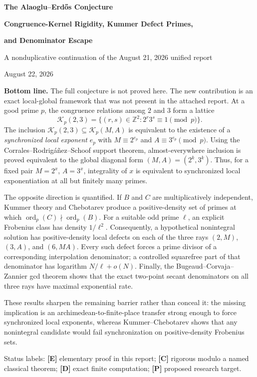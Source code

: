 \documentclass[11pt]{article}
\theoremstyle{definition}
\newcommand{\Z}{\mathbb Z}
\newcommand{\ord}{\operatorname{ord}}
\newcommand{\Rel}{\mathcal K}
\newcommand{\statusE}{\textcolor{deepgreen}{\textbf{[E]}}}
\newcommand{\statusC}{\textcolor{deepblue}{\textbf{[C]}}}
\newcommand{\statusD}{\textcolor{deepred}{\textbf{[D]}}}
\newcommand{\statusP}{\textcolor{orange!70!black}{\textbf{[P]}}}
\begin{document}

\begin{titlepage}
\centering
\vspace*{0.65cm}
{\Huge\bfseries The Alaoglu--Erd\H{o}s Conjecture\par}
\vspace{0.4cm}
{\LARGE\bfseries Congruence-Kernel Rigidity, Kummer Defect Primes,\par}
\vspace{0.14cm}
{\LARGE\bfseries and Denominator Escape\par}
\vspace{0.65cm}
{\large A nonduplicative continuation of the August 21, 2026 unified report\par}
\vspace{0.2cm}
{\large August 22, 2026\par}
\vfill
\begin{minipage}{0.9\textwidth}
\small
\textbf{Bottom line.}
The full conjecture is not proved here.  The new contribution is an exact local-global
framework that was not present in the attached report.  At a good prime $p$, the congruence
relations among $2$ and $3$ form a lattice
\[
 \Rel_p(2,3)=\{(r,s)\in\Z^2:2^r3^s\equiv1\pmod p\}.
\]
The inclusion $\Rel_p(2,3)\subseteq\Rel_p(M,A)$ is equivalent to the existence of a
\emph{synchronized local exponent} $e_p$ with
$M\equiv2^{e_p}$ and $A\equiv3^{e_p}\pmod p$.
Using the Corrales--Rodrig\'a\~nez--Schoof support theorem, almost-everywhere inclusion is
proved equivalent to the global diagonal form $(M,A)=(2^k,3^k)$.  Thus, for a fixed pair
$M=2^x$, $A=3^x$, integrality of $x$ is equivalent to synchronized local exponentiation at
all but finitely many primes.

The opposite direction is quantified.  If $B$ and $C$ are multiplicatively independent,
Kummer theory and Chebotarev produce a positive-density set of primes at which
$\ord_p(C)\nmid\ord_p(B)$.  For a suitable odd prime $\ell$, an explicit Frobenius class has
density $1/\ell^2$.  Consequently, a hypothetical nonintegral solution has positive-density
local defects on each of the three rays $(2,M)$, $(3,A)$, and $(6,MA)$.
Every such defect forces a prime divisor of a corresponding interpolation denominator; a
controlled squarefree part of that denominator has logarithm $N/\ell+o(N)$.  Finally, the
Bugeaud--Corvaja--Zannier gcd theorem shows that the exact two-point secant denominators on all
three rays have maximal exponential rate.

These results sharpen the remaining barrier rather than conceal it: the missing implication is
an archimedean-to-finite-place transfer strong enough to force synchronized local exponents,
whereas Kummer--Chebotarev shows that any nonintegral candidate would fail synchronization on
positive-density Frobenius sets.
\end{minipage}
\vfill
{\footnotesize Status labels: \statusE{} elementary proof in this report;
\statusC{} rigorous modulo a named classical theorem; \statusD{} exact finite computation;
\statusP{} proposed research target.\par}
\end{titlepage}
\end{document}
